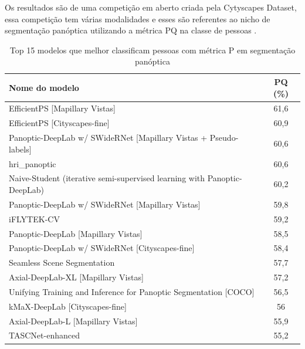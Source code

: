 Os resultados são de uma competição em aberto criada pela Cytyscapes Dataset, essa competição tem várias modalidades e esses são referentes ao nicho de segmentação panóptica utilizando a métrica PQ na classe de pessoas \cite{datasetResults}.
\begin{table}[H]
	\centering
	\caption{Top 15 modelos que melhor classificam pessoas com métrica P em segmentação panóptica}
	\label{tab:resultados-cityscapes}
	\begin{tabular}{|l|c|}
	  \hline
	  Nome do modelo & PQ (\%) \\
	  \hline
	  EfficientPS [Mapillary Vistas] & 61,6 \\
	  EfficientPS [Cityscapes-fine] & 60,9 \\
	  Panoptic-DeepLab w/ SWideRNet [Mapillary Vistas + Pseudo-labels] & 60,6 \\
	  hri\_panoptic & 60,6 \\
	  Naive-Student (iterative semi-supervised learning with Panoptic-DeepLab) & 60,2 \\
	  Panoptic-DeepLab w/ SWideRNet [Mapillary Vistas] & 59,8 \\
	  iFLYTEK-CV & 59,2 \\
	  Panoptic-DeepLab [Mapillary Vistas] & 58,5 \\
	  Panoptic-DeepLab w/ SWideRNet [Cityscapes-fine] & 58,4 \\
	  Seamless Scene Segmentation & 57,7 \\
	  Axial-DeepLab-XL [Mapillary Vistas] & 57,2 \\
	  Unifying Training and Inference for Panoptic Segmentation [COCO] & 56,5 \\
	  kMaX-DeepLab [Cityscapes-fine] & 56 \\
	  Axial-DeepLab-L [Mapillary Vistas] & 55,9 \\
	  TASCNet-enhanced & 55,2 \\
	  \hline
	\end{tabular}
  \end{table}
  
  

